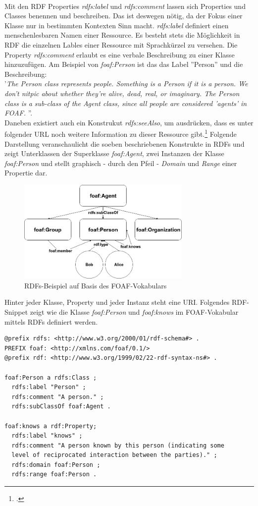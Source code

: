 \documentclass[12pt,a4paper]{article}
\begin{document}
\\
Mit den RDF Properties \textit{rdfs:label} und \textit{rdfs:comment} lassen sich Properties und Classes benennen und beschreiben. Das ist deswegen nötig, da der Fokus einer Klasse nur in bestimmten Kontexten Sinn macht. \textit{rdfs:label} definiert einen menschenlesbaren Namen einer Ressource. Es besteht stets die Möglichkeit in RDF die einzelnen Lables einer Ressource mit Sprachkürzel zu versehen. Die Property \textit{rdfs:comment} erlaubt es eine verbale Beschreibung zu einer Klasse hinzuzufügen. Am Beispiel von \textit{foaf:Person} ist das das Label ''Person'' und die Beschreibung:\\
'\textit{The Person class represents people. Something is a Person if it is a person. We don't nitpic about whether they're alive, dead, real, or imaginary. The Person class is a sub-class of the Agent class, since all people are considered 'agents' in FOAF. }''.\\
Daneben existiert auch ein Konstrukut \textit{rdfs:seeAlso}, um ausdrücken, dass es unter folgender URL noch weitere Information zu dieser Ressource gibt.\footcite{brickley2014rdf} Folgende Darstellung veranschaulicht die soeben beschriebenen Konstrukte in RDFs und zeigt Unterklassen der Superklasse \textit{foaf:Agent}, zwei Instanzen der Klasse \textit{foaf:Person} und stellt graphisch - durch den Pfeil - \textit{Domain} und \textit{Range} einer Propertie dar. 
\begin{figure}[H]
  \centering
	\includegraphics[width=0.75\textwidth]{img/rdfs.png}  
    \caption[RDFs-Beispiel auf Basis des FOAF-Vokabulars, eigene Darstellung.]{RDFs-Beispiel auf Basis des FOAF-Vokabulars}
  	\label{fig:rdf}
\end{figure}
Hinter jeder Klasse, Property und  jeder Instanz steht eine URI. Folgendes RDF-Snippet zeigt wie die Klasse \textit{foaf:Person} und \textit{foaf:knows} im FOAF-Vokabular mittels RDFs definiert werden.
\begin{lstlisting}[]
@prefix rdfs: <http://www.w3.org/2000/01/rdf-schema#> .
PREFIX foaf: <http://xmlns.com/foaf/0.1/>
@prefix rdf: <http://www.w3.org/1999/02/22-rdf-syntax-ns#> .

foaf:Person a rdfs:Class ;
  rdfs:label "Person" ;
  rdfs:comment "A person." ;
  rdfs:subClassOf foaf:Agent .
  
foaf:knows a rdf:Property;
  rdfs:label "knows" ;
  rdfs:comment "A person known by this person (indicating some 
  level of reciprocated interaction between the parties)." ;
  rdfs:domain foaf:Person ;
  rdfs:range foaf:Person .
\end{lstlisting}
\end{document}

